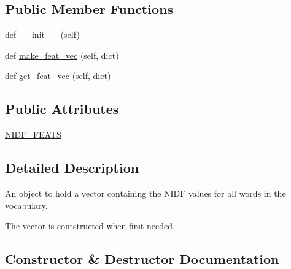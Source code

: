 \subsection*{Public Member Functions}
\begin{DoxyCompactItemize}
\item 
def \hyperlink{classprojects_1_1controllable__dialogue_1_1controllable__seq2seq_1_1controls_1_1NIDFFeats_ad812b961118077aeb5099cae4373cdd4}{\+\_\+\+\_\+init\+\_\+\+\_\+} (self)
\item 
def \hyperlink{classprojects_1_1controllable__dialogue_1_1controllable__seq2seq_1_1controls_1_1NIDFFeats_aa47a19d4008d0431359caa6d813f34bc}{make\+\_\+feat\+\_\+vec} (self, dict)
\item 
def \hyperlink{classprojects_1_1controllable__dialogue_1_1controllable__seq2seq_1_1controls_1_1NIDFFeats_a43490f17254d5695620c6cc63eb2e491}{get\+\_\+feat\+\_\+vec} (self, dict)
\end{DoxyCompactItemize}
\subsection*{Public Attributes}
\begin{DoxyCompactItemize}
\item 
\hyperlink{classprojects_1_1controllable__dialogue_1_1controllable__seq2seq_1_1controls_1_1NIDFFeats_a6717e3ef6420caafd4eb177c07e007fe}{N\+I\+D\+F\+\_\+\+F\+E\+A\+TS}
\end{DoxyCompactItemize}


\subsection{Detailed Description}
\begin{DoxyVerb}An object to hold a vector containing the NIDF values for all words in the
vocabulary.

The vector is contstructed when first needed.
\end{DoxyVerb}
 

\subsection{Constructor \& Destructor Documentation}
\mbox{\label{classprojects_1_1controllable__dialogue_1_1controllable__seq2seq_1_1controls_1_1NIDFFeats_ad812b961118077aeb5099cae4373cdd4}} 

